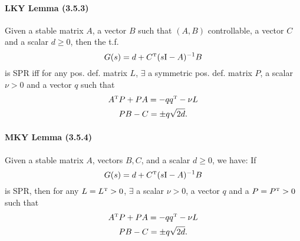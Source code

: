\paragraph{LKY Lemma (3.5.3)}
Given a stable matrix $A$, a vector $B$ such that $(A,B)$ controllable, a vector $C$ and a scalar $d \geq 0$, then the t.f.
\begin{equation}
	G(s) = d + C^{\scriptscriptstyle \mathrm{T}} (s \mathrm{I} - A)^{-1} B
\end{equation}
is SPR iff for any pos. def. matrix $L$, $\exists$ a symmetric pos. def. matrix $P$, a scalar $\nu > 0$ and a vector $q$ such that
\begin{gather}
	A^{\scriptscriptstyle \mathrm{T}} P + P A = -q q^{\scriptscriptstyle \mathrm{T}} - \nu L \\
	P B - C = \pm q \sqrt{2d}
	.
\end{gather}

\paragraph{MKY Lemma (3.5.4)}
Given a stable matrix $A$, vectors $B,C$, and a scalar $d \geq 0$, we have: If
\begin{equation}
	G(s) = d + C^{\scriptscriptstyle \mathrm{T}} (s \mathrm{I} - A)^{-1} B
\end{equation}
is SPR, then for any $L = L^{\scriptscriptstyle \mathrm{T}} > 0$, $\exists$ a scalar $\nu > 0$, a vector $q$ and a $P = P^{\scriptscriptstyle \mathrm{T}} > 0$ such that
\begin{gather}
	A^{\scriptscriptstyle \mathrm{T}} P + P A = -q q^{\scriptscriptstyle \mathrm{T}} - \nu L \\
	P B - C = \pm q \sqrt{2d}
	.
\end{gather}